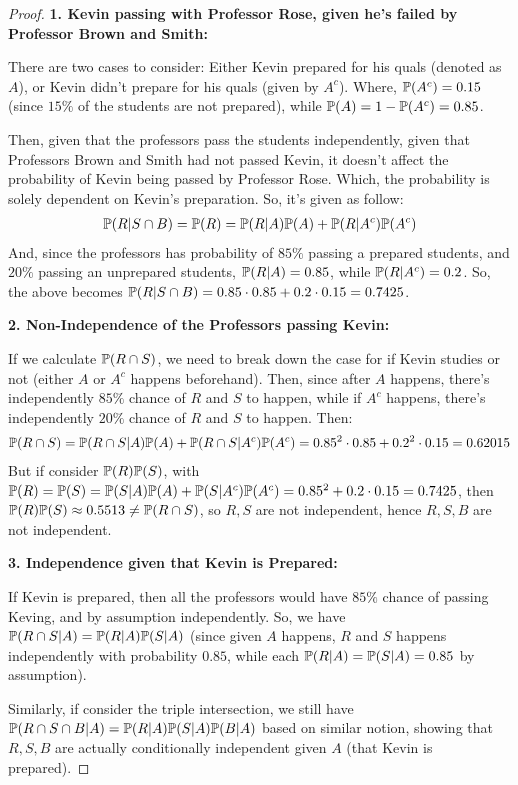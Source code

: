 \documentclass{article}
\begin{document}
\begin{proof}

    \hfil

    \textbf{1. Kevin passing with Professor Rose, given he's failed by Professor Brown and Smith:}

    There are two cases to consider: Either Kevin prepared for his quals (denoted as $A$), or Kevin didn't prepare for his quals (given by $A^c$). Where, $\mathbb{P}(A^c)=0.15$ (since $15\%$ of the students are not prepared), while $\mathbb{P}(A)=1-\mathbb{P}(A^c)=0.85$.

    Then, given that the professors pass the students independently, given that Professors Brown and Smith had not passed Kevin, it doesn't affect the probability of Kevin being passed by Professor Rose. Which, the probability is solely dependent on Kevin's preparation. So, it's given as follow:
    \begin{align}
        \mathbb{P}(R|S\cap B)=\mathbb{P}(R)=\mathbb{P}(R|A)\mathbb{P}(A) + \mathbb{P}(R|A^c)\mathbb{P}(A^c)
    \end{align}
    And, since the professors has probability of $85\%$ passing a prepared students, and $20\%$ passing an unprepared students, $\mathbb{P}(R|A)=0.85$, while $\mathbb{P}(R|A^c)=0.2$. So, the above becomes $\mathbb{P}(R|S\cap B)=0.85\cdot 0.85+0.2\cdot 0.15 = 0.7425$.
    
    \hfil

    \textbf{2. Non-Independence of the Professors passing Kevin:}

    If we calculate $\mathbb{P}(R\cap S)$, we need to break down the case for if Kevin studies or not (either $A$ or $A^c$ happens beforehand). Then, since after $A$ happens, there's independently $85\%$ chance of $R$ and $S$ to happen, while if $A^c$ happens, there's independently $20\%$ chance of $R$ and $S$ to happen. Then:
    \begin{align}
        \mathbb{P}(R\cap S)=\mathbb{P}(R\cap S|A)\mathbb{P}(A)+\mathbb{P}(R\cap S|A^c)\mathbb{P}(A^c) = 0.85^2\cdot 0.85+0.2^2\cdot 0.15 = 0.62015
    \end{align}
    But if consider $\mathbb{P}(R)\mathbb{P}(S)$, with $\mathbb{P}(R)=\mathbb{P}(S)=\mathbb{P}(S|A)\mathbb{P}(A)+\mathbb{P}(S|A^c)\mathbb{P}(A^c)=0.85^2+0.2\cdot 0.15=0.7425$, then $\mathbb{P}(R)\mathbb{P}(S)\approx 0.5513 \neq \mathbb{P}(R\cap S)$, so $R,S$ are not independent, hence $R,S,B$ are not independent.

    \hfil

    \textbf{3. Independence given that Kevin is Prepared:}

    If Kevin is prepared, then all the professors would have $85\%$ chance of passing Keving, and by assumption independently. So, we have $\mathbb{P}(R\cap S|A)=\mathbb{P}(R|A)\mathbb{P}(S|A)$ (since given $A$ happens, $R$ and $S$ happens independently with probability $0.85$, while each $\mathbb{P}(R|A)=\mathbb{P}(S|A)=0.85$ by assumption).

    Similarly, if consider the triple intersection, we still have $\mathbb{P}(R\cap S\cap B|A)=\mathbb{P}(R|A)\mathbb{P}(S|A)\mathbb{P}(B|A)$ based on similar notion, showing that $R,S,B$ are actually conditionally independent given $A$ (that Kevin is prepared).
\end{proof}
\end{document}
